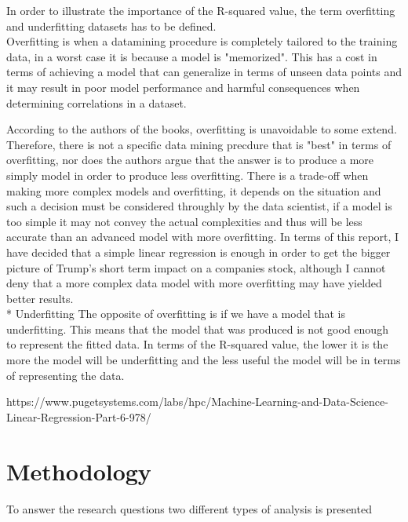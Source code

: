 \documentclass{article}
\begin{document}
In order to illustrate the importance of the R-squared value, the term overfitting and underfitting  datasets has to be defined. \\

Overfitting is when a datamining procedure is completely tailored to the training data, in a worst case it is because a model is "memorized". This has a cost in terms of achieving a model that can generalize in terms of unseen data points and it may result in poor model performance and harmful consequences when determining correlations in a dataset. 

 According to the authors of the books, overfitting is unavoidable to some extend. Therefore, there is not a specific data mining precdure that is "best" in terms of overfitting, nor does the authors argue that the answer is to produce a more simply model in order to produce less overfitting. There is a trade-off when making more complex models and overfitting, it depends on the situation and such a decision must be considered throughly by the data scientist, if a model is too simple it may not convey the actual complexities and thus will be less accurate than an advanced model with more overfitting.
In terms of this report, I have decided that a simple linear regression is enough in order to get the bigger picture of Trump's short term impact on a companies stock, although I cannot deny that a more complex data model with more overfitting may have yielded better results. \\

* Underfitting
The opposite of overfitting is if we have a model that is underfitting. This means that the model that was produced is not good enough to represent the fitted data.  In terms of the R-squared value, the lower it is the more the model will be underfitting and the less useful the model will be in terms of representing the data.


https://www.pugetsystems.com/labs/hpc/Machine-Learning-and-Data-Science-Linear-Regression-Part-6-978/





\section{Methodology}
To answer the research questions two different types of analysis is presented\\
\end{document}
